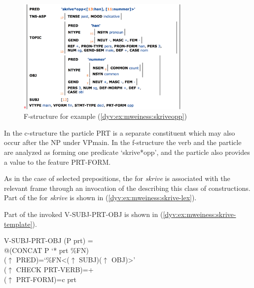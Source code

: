 \documentclass[output=paper]{langsci/langscibook}
\begin{document}
\begin{figure}
  \includegraphics[width=0.75\textwidth]{figures/particlecons-f.png}
  \caption{F-structure for example (\ref{dyv:ex:mweiness:skriveopp})}
  \label{dyv:fig:mweiness:particlecons-f}
\end{figure}


In the c-structure the particle PRT is a separate constituent which may also occur after the NP under VPmain.
In the f-structure the verb and the particle are analyzed as forming one predicate `skrive*opp', and the particle also provides a value to the feature PRT-FORM.

As in the case of selected prepositions, the  for \textit{skrive} is associated with the relevant frame through an invocation of the  describing this class of constructions.
Part of the  for \textit{skrive} is shown in  (\ref{dyv:ex:mweiness:skrive-lex}).


Part of the invoked  V-SUBJ-PRT-OBJ is shown in  (\ref{dyv:ex:mweiness:skrive-template}).

\ea\label{dyv:ex:mweiness:skrive-template}
{\small 
V-SUBJ-PRT-OBJ (P prt) =\\
\hspace{2em} @(CONCAT P `* prt \%FN)\\
\hspace{2em}  ($\uparrow$ PRED)=`\%FN<($\uparrow$ SUBJ)($\uparrow$ OBJ)>'\\
\hspace{2em}  ($\uparrow$ CHECK PRT-VERB)=+\\
\hspace{2em}  ($\uparrow$ PRT-FORM)=c prt
}
\z
\end{document}
